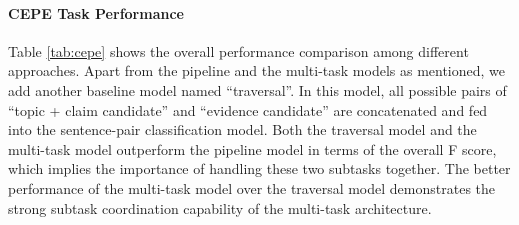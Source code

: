 \documentclass[11pt]{article}
\begin{document}
\paragraph{CEPE Task Performance}
Table \ref{tab:cepe} shows the overall performance comparison among different approaches.
Apart from the pipeline and the multi-task models as mentioned, we add another baseline model named ``traversal''.
In this model, all possible pairs of  ``topic + claim candidate''
and ``evidence candidate'' 
are concatenated and fed into the sentence-pair classification model.
Both the traversal model and the multi-task model outperform the pipeline model in terms of the overall F score, which implies the importance of handling these two subtasks together.
The better performance of the multi-task model over the traversal model demonstrates the strong subtask coordination capability of the multi-task architecture. 




\begin{table}[t!]
	\centering
{}
\caption{Examples of model predictions for CEPE task.
PL stands for the pipeline, and MT stands for the multi-task. 
    We select four sentences from the evidence candidates to demonstrate the prediction results here.}
	\label{tab:casestudy}
\end{table}
        
\end{document}
